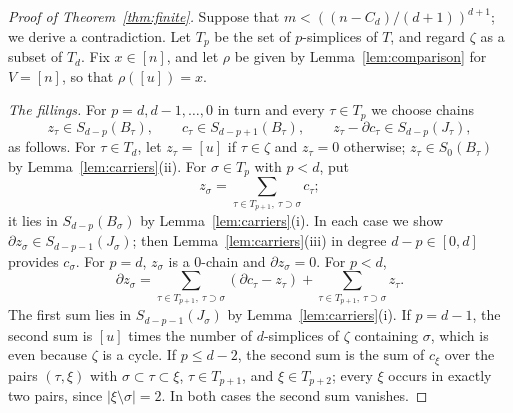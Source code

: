 \documentclass[11pt]{article}
\theoremstyle{definition}
\numberwithin{equation}{section}
\begin{document}
\begin{proof}[Proof of Theorem~\ref{thm:finite}]
Suppose that $m<((n-C_d)/(d+1))^{d+1}$; we derive a contradiction. Let $T_p$ be the set of $p$-simplices of $T$, and regard $\zeta$ as a subset of $T_d$. Fix $x\in[n]$, and let $\rho$ be given by Lemma~\ref{lem:comparison} for $V=[n]$, so that $\rho([u])=x$.

\emph{The fillings.} For $p=d,d-1,\ldots,0$ in turn and every $\tau\in T_p$ we choose chains
\begin{equation*}
 z_\tau\in S_{d-p}(B_\tau),\qquad c_\tau\in S_{d-p+1}(B_\tau),\qquad z_\tau-\partial c_\tau\in S_{d-p}(J_\tau),
\end{equation*}
as follows. For $\tau\in T_d$, let $z_\tau=[u]$ if $\tau\in\zeta$ and $z_\tau=0$ otherwise; $z_\tau\in S_0(B_\tau)$ by Lemma~\ref{lem:carriers}(ii). For $\sigma\in T_p$ with $p<d$, put
\begin{equation*}
 z_\sigma=\sum_{\tau\in T_{p+1},\ \tau\supset\sigma}c_\tau;
\end{equation*}
it lies in $S_{d-p}(B_\sigma)$ by Lemma~\ref{lem:carriers}(i). In each case we show $\partial z_\sigma\in S_{d-p-1}(J_\sigma)$; then Lemma~\ref{lem:carriers}(iii) in degree $d-p\in[0,d]$ provides $c_\sigma$. For $p=d$, $z_\sigma$ is a $0$-chain and $\partial z_\sigma=0$. For $p<d$,
\begin{equation*}
 \partial z_\sigma=\sum_{\tau\in T_{p+1},\ \tau\supset\sigma}(\partial c_\tau-z_\tau)+\sum_{\tau\in T_{p+1},\ \tau\supset\sigma}z_\tau.
\end{equation*}
The first sum lies in $S_{d-p-1}(J_\sigma)$ by Lemma~\ref{lem:carriers}(i). If $p=d-1$, the second sum is $[u]$ times the number of $d$-simplices of $\zeta$ containing $\sigma$, which is even because $\zeta$ is a cycle. If $p\le d-2$, the second sum is the sum of $c_\xi$ over the pairs $(\tau,\xi)$ with $\sigma\subset\tau\subset\xi$, $\tau\in T_{p+1}$, and $\xi\in T_{p+2}$; every $\xi$ occurs in exactly two pairs, since $|\xi\setminus\sigma|=2$. In both cases the second sum vanishes.


\end{proof}
\end{document}
